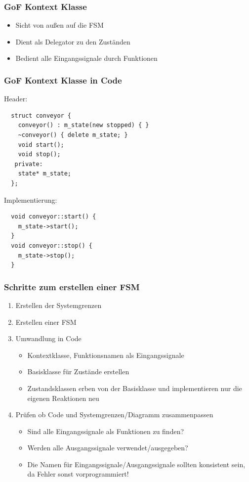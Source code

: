 \documentclass{beamer}
\begin{document}
\begin{frame}
 \frametitle{GoF Kontext Klasse}
 \begin{itemize}
  \item Sicht von au{\ss}en auf die FSM
  \item Dient als Delegator zu den Zust\"anden
  \item Bedient alle Eingangssignale durch Funktionen
 \end{itemize}
\end{frame}

\begin{frame}[fragile]
 \frametitle{GoF Kontext Klasse in Code}
 Header:
 \begin{lstlisting}
  struct conveyor {
    conveyor() : m_state(new stopped) { }
    ~conveyor() { delete m_state; }
    void start();
    void stop();
   private:
    state* m_state;
  };
 \end{lstlisting}
 Implementierung:
 \begin{lstlisting}
  void conveyor::start() {
    m_state->start();
  }
  void conveyor::stop() {
    m_state->stop();
  }
 \end{lstlisting}
\end{frame}

\begin{frame}
 \frametitle{Schritte zum erstellen einer FSM}
 \begin{enumerate}
  \item Erstellen der Systemgrenzen
  \item Erstellen einer FSM
  \item Umwandlung in Code
  \begin{itemize}
   \item Kontextklasse, Funktionsnamen als Eingangssignale
   \item Basisklasse f\"ur Zust\"ande erstellen
   \item Zustandsklassen erben von der Basisklasse und implementieren nur die eigenen Reaktionen neu
  \end{itemize}
  \item Pr\"ufen ob Code und Systemgrenzen/Diagramm zusammenpassen
  \begin{itemize}
   \item Sind alle Eingangssignale als Funktionen zu finden?
   \item Werden alle Ausgangssignale verwendet/ausgegeben?
   \item Die Namen f\"ur Eingangssignale/Ausgangssignale sollten konsistent sein, da Fehler sonst vorprogrammiert!
  \end{itemize}
 \end{enumerate}
\end{frame}
\end{document}
